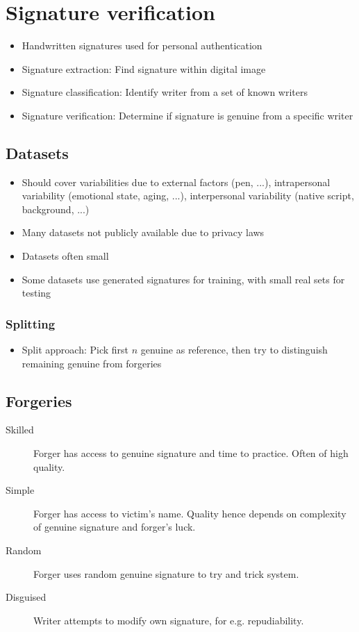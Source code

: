 \section{Signature verification}

\begin{itemize}
		\item Handwritten signatures used for personal authentication
		\item Signature extraction: Find signature within digital image
		\item Signature classification: Identify writer from a set of known
				writers
		\item Signature verification: Determine if signature is genuine from a
				specific writer
\end{itemize}

\subsection{Datasets}

\begin{itemize}
		\item Should cover variabilities due to external factors (pen, ...),
				intrapersonal variability (emotional state, aging, ...),
				interpersonal variability (native script, background, ...)
		\item Many datasets not publicly available due to privacy laws
		\item Datasets often small
		\item Some datasets use generated signatures for training, with small
				real sets for testing
\end{itemize}

\subsubsection{Splitting}

\begin{itemize}
		\item Split approach: Pick first $n$ genuine as reference, then try to
				distinguish remaining genuine from forgeries
\end{itemize}

\subsection{Forgeries}

\begin{description}
		\item[Skilled] Forger has access to genuine signature and time to
				practice. Often of high quality.
		\item[Simple] Forger has access to victim's name. Quality hence depends
				on complexity of genuine signature and forger's luck.
		\item[Random] Forger uses random genuine signature to try and trick
				system.
		\item[Disguised] Writer attempts to modify own signature, for e.g.
				repudiability.
\end{description}

